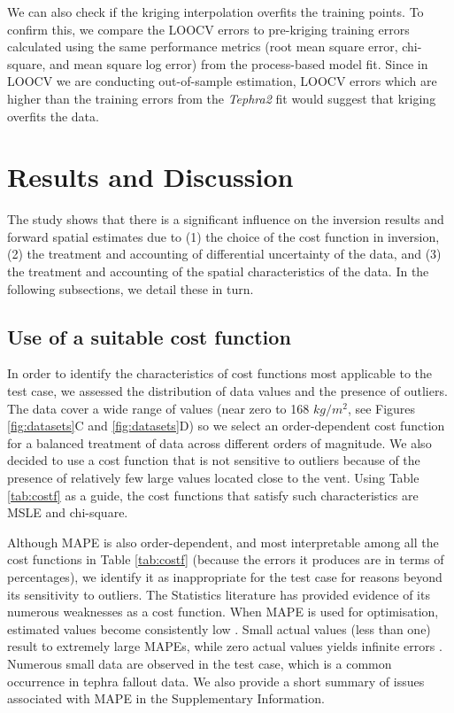     We can also check if the kriging interpolation overfits the training points. To confirm this, we compare the LOOCV errors to pre-kriging training errors calculated using the same performance metrics (root mean square error, chi-square, and mean square log error) from the process-based model fit. Since in LOOCV we are conducting out-of-sample estimation, LOOCV errors which are higher than the training errors from the \textit{Tephra2} fit would suggest that kriging overfits the data.
  
\section{Results and Discussion}\label{section-results} %

The study shows that there is a significant influence on the inversion results and forward spatial estimates due to (1) the choice of the cost function in inversion, (2) the treatment and accounting of differential uncertainty of the data, and (3) the treatment and accounting of the spatial characteristics of the data. In the following subsections, we detail these in turn.

\subsection{Use of a suitable cost function} \label{subsection-res-costf}

In order to identify the characteristics of cost functions most applicable to the test case, we assessed the distribution of data values and the presence of outliers. The data cover a wide range of values (near zero to 168 $kg/m^{2}$, see Figures \ref{fig:datasets}C and \ref{fig:datasets}D) so we select an order-dependent cost function for a balanced treatment of data across different orders of magnitude. We also decided to use a cost function that is not sensitive to outliers because of the presence of relatively few large values located close to the vent. Using Table \ref{tab:costf} as a guide, the cost functions that satisfy such characteristics are MSLE and chi-square.

Although MAPE is also order-dependent, and most interpretable among all the cost functions in Table \ref{tab:costf} (because the errors it produces are in terms of percentages), we identify it as inappropriate for the test case for reasons beyond its sensitivity to outliers. The Statistics literature has provided evidence of its numerous weaknesses as a cost function. When MAPE is used for optimisation, estimated values become consistently low \citep{tofallis2015better}. Small actual values (less than one) result to extremely large MAPEs, while zero actual values yields infinite errors \citep{kim2016new}. Numerous small data are observed in the test case, which is a common occurrence in tephra fallout data. We also provide a short summary of issues associated with MAPE in the Supplementary Information.

